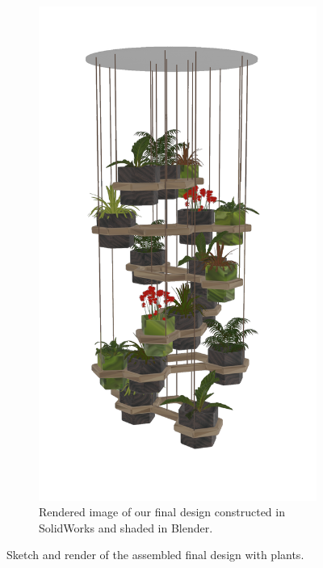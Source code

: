 \documentclass[12pt]{extarticle} %
\begin{document}
\begin{figure}[ht]
     \hfill
     \begin{subfigure}[b]{0.44\textwidth}
         \centering
         \includegraphics[width=\textwidth]{images/screenshots/plant_pot_transparent.png}
         \caption{Rendered image of our final design constructed in SolidWorks and shaded in Blender.}
         \label{fig:rendered_whole_structure}
     \end{subfigure}
     \caption{Sketch and render of the assembled final design with plants.}
\end{figure}
\end{document}
